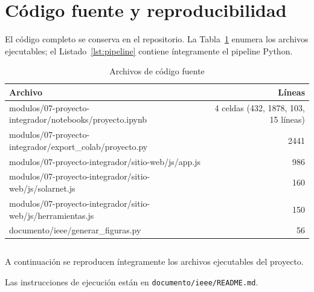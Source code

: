 \section{Código fuente y reproducibilidad}
El código completo se conserva en el repositorio. La Tabla~\ref{tab:codigo} enumera los archivos ejecutables; el Listado~\ref{lst:pipeline} contiene íntegramente el pipeline Python.
\begin{table}[p]
\caption{Archivos de código fuente}
\label{tab:codigo}
\centering\footnotesize
\begin{tabular}{@{}lr@{}}
\toprule
Archivo & Líneas \\
\midrule
modulos/07-proyecto-integrador/notebooks/proyecto.ipynb & 4 celdas (432, 1878, 103, 15 líneas) \\
modulos/07-proyecto-integrador/export\_colab/proyecto.py & 2441 \\
modulos/07-proyecto-integrador/sitio-web/js/app.js & 986 \\
modulos/07-proyecto-integrador/sitio-web/js/solarnet.js & 160 \\
modulos/07-proyecto-integrador/sitio-web/js/herramientas.js & 150 \\
documento/ieee/generar\_figuras.py & 56 \\
\bottomrule
\end{tabular}
\end{table}
\begin{verbatim}
\end{verbatim}
A continuación se reproducen íntegramente los archivos ejecutables del proyecto.




Las instrucciones de ejecución están en \texttt{documento/ieee/README.md}.
